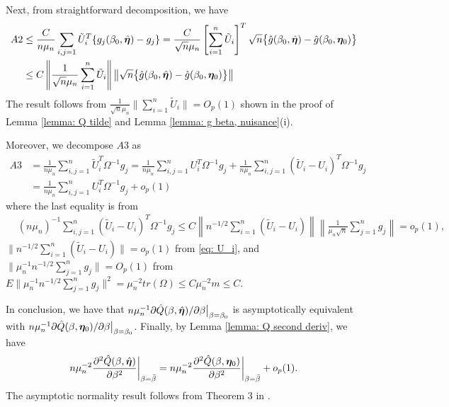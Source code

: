 \documentclass[12pt]{article}
\begin{document}
{Next, from straightforward decomposition, we have
\begin{align*} 
A2& \leq \frac{C}{n\mu_n} \sum_{i,j=1} \tilde U_i^T  \{ g_j (\beta_0, \hat{\bm \eta})- g_j\}= \frac{C}{\sqrt{n}\mu_n} \left[\sum_{i=1}^n\tilde U_i \right]^T  \sqrt{n}\big\{\hat g(\beta_0, \hat{\bm \eta}) - \hat g(\beta_0, \bm \eta_0) \big\} \\
&\leq C  \left\| \frac{1}{\sqrt{n} \mu_n}  \sum_{i=1}^n\tilde U_i   \right\| \left\|  \sqrt{n}\big\{\hat g(\beta_0, \hat{\bm \eta}) - \hat g(\beta_0, \bm \eta_0) \big\}   \right\|
\end{align*}
The result follows from  $\frac{1}{\sqrt{n}\mu_n} \| \sum_{i=1}^n \tilde U_i \|=  O_p(1)$  shown in the proof of Lemma \ref{lemma: Q tilde} and Lemma \ref{lemma: g beta, nuisance}(i). 





Moreover, we decompose $A3$ as 
\begin{align*}
	A3&= \frac{1}{n\mu_n} \sum_{i, j=1}^n \tilde{U}_i^T \Omega^{-1} g_j= \frac{1}{n\mu_n} \sum_{i, j=1}^n {U}_i^T \Omega^{-1} g_j + \frac{1}{n\mu_n} \sum_{i, j=1}^n (\tilde U_i - U_i)^T \Omega^{-1} g_j\\
	&= \frac{1}{n\mu_n} \sum_{i, j=1}^n {U}_i^T \Omega^{-1} g_j + o_p(1)
\end{align*}
where the last equality is from  
\begin{align*}
	&(n\mu_n)^{-1} \sum_{i,j=1}^n (\tilde U_i- U_i)^T \Omega^{-1} g_j \leq  C \left\|  n^{-1/2}\sum_{i=1}^n (\tilde U_i- U_i)\right\| \left\| \frac{1}{\mu_n\sqrt{n}} \sum_{j=1}^n g_j \right\| = o_p(1),
\end{align*}
 $\| n^{-1/2}\sum_{i=1}^n (\tilde U_i- U_i)\|=o_p(1)$ from  \eqref{eq: U_i}, and $\|\mu_n^{-1}n^{-1/2} \sum_{j=1}^n g_j \| =O_p(1)$ from \\ $E \|\mu_n^{-1}n^{-1/2} \sum_{j=1}^n g_j\|^2 =\mu_n^{-2} tr( \Omega )\leq C \mu_n^{-2} m \leq C$.




In conclusion, we have that $ n \mu_n^{-1} \partial \hat{Q} (\beta, \hat {\bm \eta})/\partial \beta \big|_{\beta= \beta_0}$ is asymptotically equivalent with $ n \mu_n^{-1} \partial \hat{Q} (\beta,  \bm \eta_0)/\partial \beta \big|_{\beta= \beta_0}$. 
Finally, by Lemma \ref{lemma: Q second deriv}, we have
\[
n \mu_n^{-2}\frac{\partial^2 \hat Q (\beta, \hat{\bm \eta})}{\partial \beta^2} \bigg|_{\beta=\bar\beta} =n \mu_n^{-2} \frac{\partial^2 \hat Q (\beta, \bm \eta_0)}{\partial \beta^2} \bigg|_{\beta=\bar\beta}  + o_p(1) .
\]
The asymptotic normality result follows from Theorem 3 in \cite{Newey:2009aa}.








}
\end{document}

